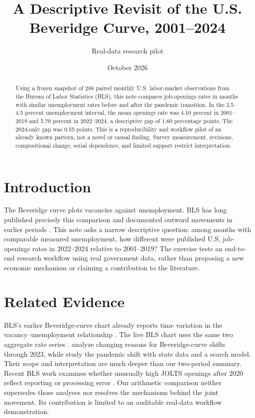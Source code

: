 \documentclass[10pt]{article}
\title{A Descriptive Revisit of the U.S. Beveridge Curve, 2001--2024}
\author{Real-data research pilot}
\date{October 2026}
\newcommand{\result}[2]{#2}
\begin{document}
\maketitle
\begin{abstract}
Using a frozen snapshot of 288 paired monthly U.S. labor-market observations from the Bureau of Labor Statistics (BLS), this note compares job-openings rates in months with similar unemployment rates before and after the pandemic transition. In the 3.5--4.5 percent unemployment interval, the mean openings rate was \result{primary.pre_mean}{4.10} percent in 2001--2019 and \result{primary.post_mean}{5.70} percent in 2022--2024, a descriptive gap of \result{primary.difference}{1.60} percentage points. The 2024-only gap was \result{last_year_check.difference_from_pre}{0.55} points. This is a reproducibility and workflow pilot of an already known pattern, not a novel or causal finding. Survey measurement, revisions, compositional change, serial dependence, and limited support restrict interpretation.
\end{abstract}

\section{Introduction}
The Beveridge curve plots vacancies against unemployment. BLS has long published precisely this comparison and documented outward movements in earlier periods \citep{BLS2013,BLSChart}. This note asks a narrow descriptive question: among months with comparable measured unemployment, how different were published U.S. job-openings rates in 2022--2024 relative to 2001--2019? The exercise tests an end-to-end research workflow using real government data, rather than proposing a new economic mechanism or claiming a contribution to the literature.

\section{Related Evidence}
BLS's earlier Beveridge-curve chart already reports time variation in the vacancy--unemployment relationship \citep{BLS2013}. The live BLS chart uses the same two aggregate rate series \citep{BLSChart}. \citet{BarlevyEtAl2023} analyze changing reasons for Beveridge-curve shifts through 2023, while \citet{KindbergGirard2024} study the pandemic shift with state data and a search model. Their scope and interpretation are much deeper than our two-period summary. Recent BLS work examines whether unusually high JOLTS openings after 2020 reflect reporting or processing error \citep{BLS2026}. Our arithmetic comparison neither supersedes those analyses nor resolves the mechanisms behind the joint movement. Its contribution is limited to an auditable real-data workflow demonstration.
\end{document}
